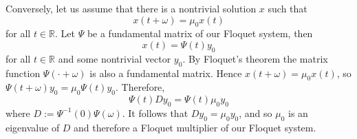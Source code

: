 \documentclass[a4paper]{article}
\begin{document}
Conversely, let us assume that there is a nontrivial solution $x$ such that \begin{equation*}
    x(t + \omega) = \mu_0 x(t)
\end{equation*}
for all $t \in \mathbb{R}$. Let $\Psi$ be a fundamental matrix of our Floquet system, then \begin{equation*}
    x(t) = \Psi(t) y_0
\end{equation*}
for all $t \in \mathbb{R}$ and some nontrivial vector $y_0$. By Floquet's theorem the matrix function $\Psi(\cdot + \omega)$ is also a fundamental matrix. Hence $x(t + \omega) = \mu_0 x(t)$, so $\Psi(t + \omega)y_0 = \mu_0 \Psi(t) y_0$. Therefore,\begin{equation*}
    \Psi(t) D y_0 = \Psi(t) \mu_0 y_0
\end{equation*}
where $D := \Psi^{-1}(0) \Psi(\omega)$. It follows that $D y_0 = \mu_0 y_0$, and so $\mu_0$ is an eigenvalue of $D$ and therefore a Floquet multiplier of our Floquet system.
\end{document}
